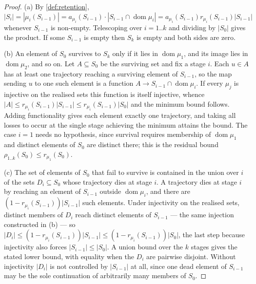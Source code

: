 \begin{proof}
(a) By \cref{def:retention}, $|S_i| = |\mu_i(S_{i-1})| =
a_{\mu_i}(S_{i-1}) \cdot |S_{i-1} \cap \operatorname{dom}\mu_i| =
a_{\mu_i}(S_{i-1}) r_{\mu_i}(S_{i-1}) |S_{i-1}|$ whenever $S_{i-1}$ is
non-empty. Telescoping over $i = 1..k$ and dividing by $|S_0|$ gives the
product. If some $S_{i-1}$ is empty then $S_k$ is empty and both sides are
zero.

(b) An element of $S_0$ survives to $S_k$ only if it lies in
$\operatorname{dom}\mu_1$, and its image lies in $\operatorname{dom}\mu_2$, and
so on. Let $A \subseteq S_0$ be the surviving set and fix a stage $i$. Each
$u \in A$ has at least one trajectory reaching a surviving element of
$S_{i-1}$, so the map sending $u$ to one such element is a function
$A \to S_{i-1} \cap \operatorname{dom}\mu_i$. If every $\mu_j$ is injective on
the realised sets this function is itself injective, whence
$|A| \leq r_{\mu_i}(S_{i-1})|S_{i-1}| \leq r_{\mu_i}(S_{i-1})|S_0|$ and the
minimum bound follows. Adding functionality gives each element exactly one
trajectory, and taking all losses to occur at the single stage achieving the
minimum attains the bound. The case $i=1$ needs no hypothesis, since survival
requires membership of $\operatorname{dom}\mu_1$ and distinct elements of $S_0$
are distinct there; this is the residual bound
$\rho_{1..k}(S_0) \leq r_{\mu_1}(S_0)$.

(c) The set of elements of $S_0$ that fail to survive is contained in the union
over $i$ of the sets $D_i \subseteq S_0$ whose trajectory dies at stage $i$.
A trajectory dies at stage $i$ by reaching an element of $S_{i-1}$ outside
$\operatorname{dom}\mu_i$, and there are $(1-r_{\mu_i}(S_{i-1}))|S_{i-1}|$ such
elements. Under injectivity on the realised sets, distinct members of $D_i$
reach distinct elements of $S_{i-1}$ --- the same injection constructed in (b)
--- so $|D_i| \leq (1-r_{\mu_i}(S_{i-1}))|S_{i-1}| \leq
(1-r_{\mu_i}(S_{i-1}))|S_0|$, the last step because injectivity also forces
$|S_{i-1}| \leq |S_0|$. A union bound over the $k$ stages gives the stated
lower bound, with equality when the $D_i$ are pairwise disjoint. Without
injectivity $|D_i|$ is not controlled by $|S_{i-1}|$ at all, since one dead
element of $S_{i-1}$ may be the sole continuation of arbitrarily many members
of $S_0$.
\end{proof}

